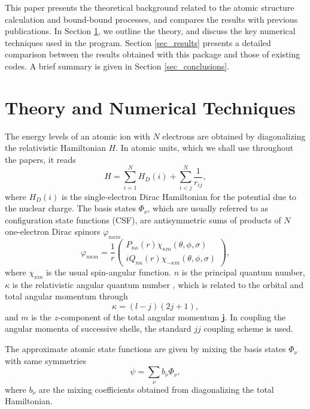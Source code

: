 \documentclass[preprint, floatfix, pra, showpacs, showkeys]{revtex4}
\begin{document}
This paper presents the theoretical background related
to the atomic structure calculation and bound-bound processes, and
compares the results with previous publications. In
Section \ref{sec_theory}, we outline the theory, and discuss the key numerical
techniques used in the program. Section \ref{sec_results} presents a detailed
comparison between the results obtained with this package and those of
existing codes. A brief summary is given in Section \ref{sec_conclusions}.

\section{Theory and Numerical Techniques}
\label{sec_theory}
The energy levels of an atomic ion with $N$ electrons are obtained by
diagonalizing the relativistic Hamiltonian $H$. In atomic units, which we shall
use throughout the papers, it reads
\begin{equation}
\label{eq_hamilton}
H = \sum_{i=1}^{N} H_{D}(i) + \sum_{i<j}^{N}\frac{1}{r_{ij}},
\end{equation}
where $H_{D}(i)$ is the single-electron Dirac Hamiltonian for the potential
due to the nuclear charge. The basis states $\Phi_{\nu}$, which are usually
referred to as configuration state functions (CSF), are antisymmetric sums of
products of $N$ one-electron Dirac spinors $\varphi_{n\kappa m}$
\begin{equation}
\label{eq_spinor}
\varphi_{n\kappa m} = \frac{1}{r}\left(\begin{array}{c}
P_{n\kappa}(r) \chi_{\kappa m}(\theta, \phi, \sigma)\\
iQ_{n\kappa}(r) \chi_{-\kappa m}(\theta, \phi, \sigma)
\end{array}\right),
\end{equation}
where $\chi_{\kappa m}$ is the usual spin-angular function. $n$ is the
principal quantum number, $\kappa$ is the relativistic angular quantum number
, which is related to the orbital and total angular momentum through
\begin{equation}
\kappa = (l-j)(2j+1),
\end{equation}
and $m$ is the $z$-component of the total angular momentum $\mathbf{j}$. In
coupling the angular momenta of successive shells, the standard $jj$ coupling
scheme is used. 

The approximate atomic state functions are given by mixing the basis
states $\Phi_{\nu}$ with same symmetries
\begin{equation}
\label{eq_asf}
\psi = \sum_{\nu} b_{\nu} \Phi_{\nu},
\end{equation}
where $b_{\nu}$ are the mixing coefficients obtained from diagonalizing the
total Hamiltonian. 
\end{document}
